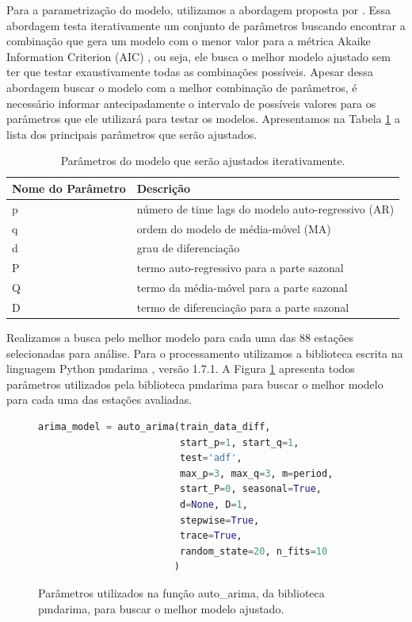 Para a parametrização do modelo, utilizamos a abordagem proposta por . Essa abordagem testa iterativamente um conjunto de parâmetros buscando encontrar a combinação que gera um modelo com o menor valor para a métrica Akaike Information Criterion (AIC) \cite{sakamoto1986akaike}, ou seja, ele busca o melhor modelo ajustado sem ter que testar exaustivamente todas as combinações possíveis. Apesar dessa abordagem buscar o modelo com a melhor combinação de parâmetros, é necessário informar antecipadamente o intervalo de possíveis valores para os parâmetros que ele utilizará para testar os modelos. Apresentamos na Tabela \ref{tab:lista_parametros_arima} a lista dos principais parâmetros que serão ajustados.

\begin{table}[H]
\caption{Parâmetros do modelo que serão ajustados iterativamente.}
\label{tab:lista_parametros_arima}
\begin{adjustbox}{width=\textwidth}
\begin{tabular}{|l|l|}
\hline
\textbf{Nome do Parâmetro} & \textbf{Descrição}\\
\hline
p  & número de time lags do modelo auto-regressivo (AR) \\
\hline
q & ordem do modelo de média-móvel (MA) \\
\hline
d & grau de diferenciação \\
\hline
P & termo auto-regressivo para a parte sazonal \\
\hline
Q & termo da média-móvel para a parte sazonal \\
\hline
D & termo de diferenciação para a parte sazonal \\
\hline
\end{tabular}
\end{adjustbox}
\end{table}

Realizamos a busca pelo melhor modelo para cada uma das 88 estações selecionadas para análise. Para o processamento utilizamos a biblioteca escrita na linguagem Python pmdarima \cite{smith2017pmdarima}, versão 1.7.1. A Figura \ref{fig:parametros_auto_arima} apresenta todos parâmetros utilizados pela biblioteca pmdarima para buscar o melhor modelo para cada uma das estações avaliadas. 


\begin{figure}[H]
\centering
\caption{Parâmetros utilizados na função auto\_arima, da biblioteca pmdarima, para buscar o melhor modelo ajustado.}
\begin{lstlisting}[language=Python]
arima_model = auto_arima(train_data_diff, 
                         start_p=1, start_q=1, 
                         test='adf',
                         max_p=3, max_q=3, m=period,
                         start_P=0, seasonal=True, 
                         d=None, D=1, 
                         stepwise=True,                 
                         trace=True,
                         random_state=20, n_fits=10
                        )
\end{lstlisting}
\label{fig:parametros_auto_arima}
\end{figure}

